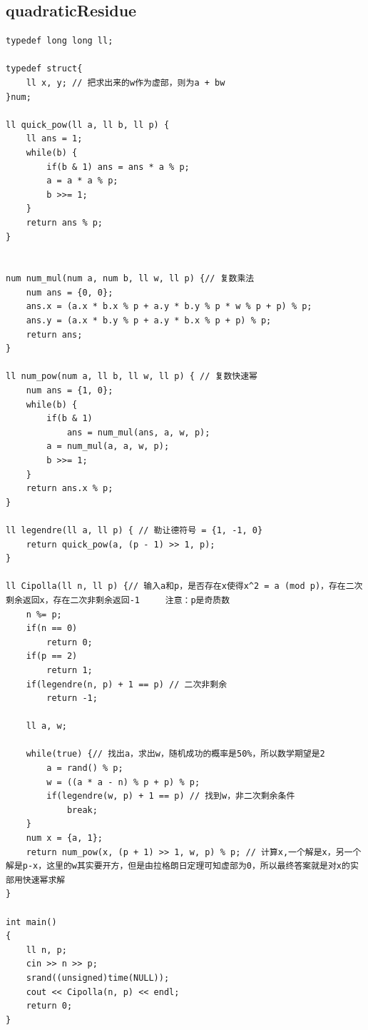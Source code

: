 \documentclass[twoside]{article}
\begin{document}
\subsection{quadraticResidue}
\begin{lstlisting}
typedef long long ll;

typedef struct{
    ll x, y; // 把求出来的w作为虚部，则为a + bw
}num;

ll quick_pow(ll a, ll b, ll p) {
    ll ans = 1;
    while(b) {
        if(b & 1) ans = ans * a % p;
        a = a * a % p;
        b >>= 1;
    }
    return ans % p;
}


num num_mul(num a, num b, ll w, ll p) {// 复数乘法
    num ans = {0, 0};
    ans.x = (a.x * b.x % p + a.y * b.y % p * w % p + p) % p;
    ans.y = (a.x * b.y % p + a.y * b.x % p + p) % p;
    return ans;
} 

ll num_pow(num a, ll b, ll w, ll p) { // 复数快速幂
    num ans = {1, 0};
    while(b) {
        if(b & 1)
            ans = num_mul(ans, a, w, p);
        a = num_mul(a, a, w, p);
        b >>= 1;
    }
    return ans.x % p;
}

ll legendre(ll a, ll p) { // 勒让德符号 = {1, -1, 0}
    return quick_pow(a, (p - 1) >> 1, p);
}

ll Cipolla(ll n, ll p) {// 输入a和p，是否存在x使得x^2 = a (mod p)，存在二次剩余返回x，存在二次非剩余返回-1     注意：p是奇质数
    n %= p;
    if(n == 0)
        return 0;
    if(p == 2)
        return 1;
    if(legendre(n, p) + 1 == p) // 二次非剩余
        return -1;
    
    ll a, w; 
    
    while(true) {// 找出a，求出w，随机成功的概率是50%，所以数学期望是2
        a = rand() % p;
        w = ((a * a - n) % p + p) % p;
        if(legendre(w, p) + 1 == p) // 找到w，非二次剩余条件
            break;
    }
    num x = {a, 1};   
    return num_pow(x, (p + 1) >> 1, w, p) % p; // 计算x,一个解是x，另一个解是p-x，这里的w其实要开方，但是由拉格朗日定理可知虚部为0，所以最终答案就是对x的实部用快速幂求解
}

int main()
{
    ll n, p;
    cin >> n >> p;
    srand((unsigned)time(NULL));
    cout << Cipolla(n, p) << endl;
    return 0;
}\end{lstlisting}
\end{document}
